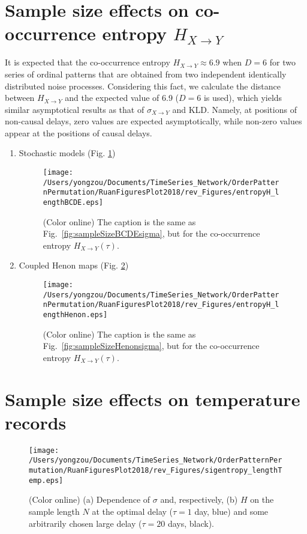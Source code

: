 \documentclass[aps,pre,superscriptaddress,floats,11pt]{revtex4}
\begin{document}
\section{Sample size effects on co-occurrence entropy $H_{X\to Y}$}
It is expected that the co-occurrence entropy $H_{X \to Y} \approx 6.9$ when $D = 6$ for two series of ordinal patterns that are obtained from two independent identically distributed noise processes. Considering this fact, we calculate the distance between $H_{X \to Y}$ and the expected value of 6.9 ($D = 6$ is used), which yields similar asymptotical results as that of $\sigma_{X\to Y}$ and KLD. Namely, at positions of non-causal delays, zero values are expected asymptotically, while non-zero values appear at the positions of causal delays. 
\begin{enumerate}
\item Stochastic models (Fig. \ref{fig:sampleSizeBCDEentropy})
\begin{figure}[htb]
	\centering
	\texttt{[image: /Users/yongzou/Documents/TimeSeries\_Network/OrderPatternPermutation/RuanFiguresPlot2018/rev\_Figures/entropyH\_lengthBCDE.eps]}
\caption{(Color online) The caption is the same as Fig.~\ref{fig:sampleSizeBCDEsigma}, but for the co-occurrence entropy $H_{X\to Y}(\tau)$. \label{fig:sampleSizeBCDEentropy}}
\end{figure}

\item Coupled Henon maps (Fig. \ref{fig:sampleSizeHenonentropy})
\begin{figure}[htb]
	\centering
	\texttt{[image: /Users/yongzou/Documents/TimeSeries\_Network/OrderPatternPermutation/RuanFiguresPlot2018/rev\_Figures/entropyH\_lengthHenon.eps]}
\caption{(Color online) The caption is the same as Fig.~\ref{fig:sampleSizeHenonsigma}, but for the co-occurrence entropy $H_{X\to Y}(\tau)$. \label{fig:sampleSizeHenonentropy}}
\end{figure}

\end{enumerate}


\section{Sample size effects on temperature records}
\begin{figure}[htb]
	\centering
	\texttt{[image: /Users/yongzou/Documents/TimeSeries\_Network/OrderPatternPermutation/RuanFiguresPlot2018/rev\_Figures/sigentropy\_lengthTemp.eps]}
\caption{(Color online) (a) Dependence of $\sigma$ and, respectively, (b) $H$ on the sample length $N$ at the optimal delay ($\tau=1$ day, blue) and some arbitrarily chosen large delay ($\tau=20$ days, black). \label{fig:sampleSizeTempentropy}}
\end{figure}
\end{document}
